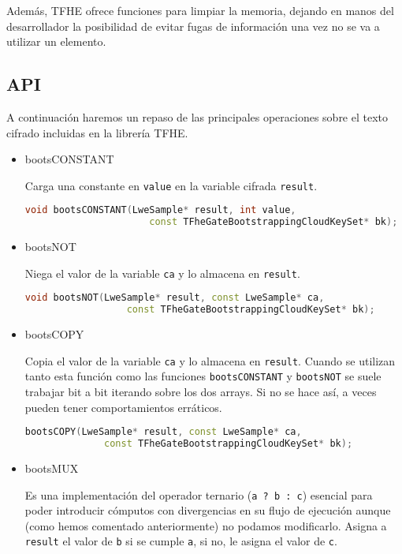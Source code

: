 Además, TFHE ofrece funciones para limpiar la memoria, dejando en manos del desarrollador la posibilidad de evitar fugas de información una vez no se va a utilizar un elemento.

\subsection{API}

A continuación haremos un repaso de las principales operaciones sobre el texto cifrado incluidas en la librería TFHE.

\begin{itemize}

  \item bootsCONSTANT

  Carga una constante en \verb|value| en la variable cifrada \verb|result|.

  \begin{lstlisting}[language=c++]
    void bootsCONSTANT(LweSample* result, int value,
                      const TFheGateBootstrappingCloudKeySet* bk);
  \end{lstlisting}

  \item bootsNOT

  Niega el valor de la variable \verb|ca| y lo almacena en \verb|result|.

  \begin{lstlisting}[language=c++]
    void bootsNOT(LweSample* result, const LweSample* ca,
                  const TFheGateBootstrappingCloudKeySet* bk);
  \end{lstlisting}

  \item bootsCOPY

  Copia el valor de la variable \verb|ca| y lo almacena en \verb|result|. Cuando se utilizan tanto esta función como las funciones \verb|bootsCONSTANT|  y \verb|bootsNOT| se suele trabajar bit a bit iterando sobre los dos arrays. Si no se hace así, a veces pueden tener comportamientos erráticos.

  \begin{lstlisting}[language=c++]
    bootsCOPY(LweSample* result, const LweSample* ca,
              const TFheGateBootstrappingCloudKeySet* bk);
  \end{lstlisting}

  \item bootsMUX

  Es una implementación del operador ternario (\verb|a ? b : c|) esencial para poder introducir cómputos con divergencias en su flujo de ejecución aunque (como hemos comentado anteriormente) no podamos modificarlo. Asigna a \verb|result| el valor de \verb|b| si se cumple \verb|a|, si no, le asigna el valor de \verb|c|.


\end{itemize}
